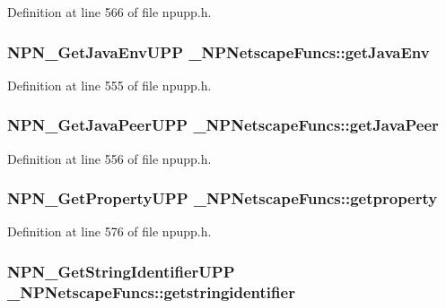 Definition at line 566 of file npupp.h.

\hypertarget{struct___n_p_netscape_funcs_a3b0a3e92ed9740cac77d82fdd8b8d475}{
\subsubsection[{getJavaEnv}]{\setlength{\rightskip}{0pt plus 5cm}NPN\_\-GetJavaEnvUPP {\bf \_\-NPNetscapeFuncs::getJavaEnv}}}
\label{struct___n_p_netscape_funcs_a3b0a3e92ed9740cac77d82fdd8b8d475}


Definition at line 555 of file npupp.h.

\hypertarget{struct___n_p_netscape_funcs_a6975746fc043d1ec514d3703a227d161}{
\subsubsection[{getJavaPeer}]{\setlength{\rightskip}{0pt plus 5cm}NPN\_\-GetJavaPeerUPP {\bf \_\-NPNetscapeFuncs::getJavaPeer}}}
\label{struct___n_p_netscape_funcs_a6975746fc043d1ec514d3703a227d161}


Definition at line 556 of file npupp.h.

\hypertarget{struct___n_p_netscape_funcs_ac0f681694d72e58f5cd6c3cefee939ea}{
\subsubsection[{getproperty}]{\setlength{\rightskip}{0pt plus 5cm}NPN\_\-GetPropertyUPP {\bf \_\-NPNetscapeFuncs::getproperty}}}
\label{struct___n_p_netscape_funcs_ac0f681694d72e58f5cd6c3cefee939ea}


Definition at line 576 of file npupp.h.

\hypertarget{struct___n_p_netscape_funcs_a60933fa78617d624dad58fbad07682e8}{
\subsubsection[{getstringidentifier}]{\setlength{\rightskip}{0pt plus 5cm}NPN\_\-GetStringIdentifierUPP {\bf \_\-NPNetscapeFuncs::getstringidentifier}}}
\label{struct___n_p_netscape_funcs_a60933fa78617d624dad58fbad07682e8}


